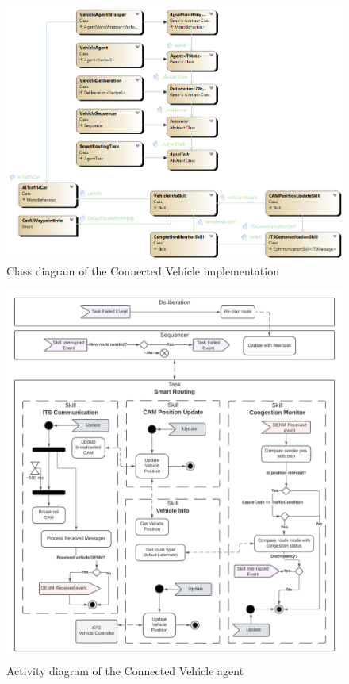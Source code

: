 \documentclass[main.tex]{subfiles}
\begin{document}
\begin{figure}[htbp]
    \centering
    \includegraphics[width=.9\textwidth]{cd-SmartRoutingAgent.png}
    \caption{Class diagram of the Connected Vehicle implementation}
    \label{cd-smartRoutingVehicle}
\end{figure}

\begin{figure}[htbp]
    \centering
    \includegraphics[width=.99\textwidth]{SmartRoutingVehicle.png}
    \caption{Activity diagram of the Connected Vehicle agent}
    \label{ad-smartRoutingVehicle}
\end{figure}
\end{document}
